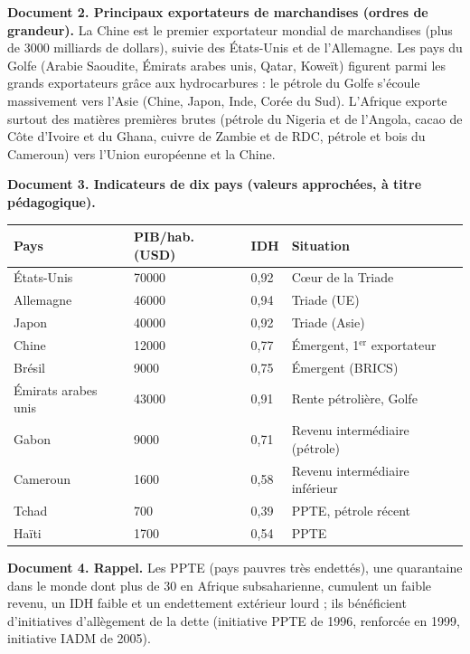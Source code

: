 \documentclass[11pt]{article}
\begin{document}
\textbf{Document 2. Principaux exportateurs de marchandises (ordres de grandeur).} La Chine est le premier exportateur mondial de marchandises (plus de \num{3000} milliards de dollars), suivie des États-Unis et de l'Allemagne. Les pays du Golfe (Arabie Saoudite, Émirats arabes unis, Qatar, Koweït) figurent parmi les grands exportateurs grâce aux hydrocarbures : le pétrole du Golfe s'écoule massivement vers l'Asie (Chine, Japon, Inde, Corée du Sud). L'Afrique exporte surtout des matières premières brutes (pétrole du Nigeria et de l'Angola, cacao de Côte d'Ivoire et du Ghana, cuivre de Zambie et de RDC, pétrole et bois du Cameroun) vers l'Union européenne et la Chine.

\textbf{Document 3. Indicateurs de dix pays (valeurs approchées, à titre pédagogique).}

\begin{center}
\begin{tabularx}{\linewidth}{|l|X|X|X|}
\hline
\rowcolor{popblueL} \textbf{Pays} & \textbf{PIB/hab. (USD)} & \textbf{IDH} & \textbf{Situation} \\
\hline
États-Unis & \num{70000} & 0,92 & Cœur de la Triade \\
\hline
Allemagne & \num{46000} & 0,94 & Triade (UE) \\
\hline
Japon & \num{40000} & 0,92 & Triade (Asie) \\
\hline
Chine & \num{12000} & 0,77 & Émergent, 1$^{\text{er}}$ exportateur \\
\hline
Brésil & \num{9000} & 0,75 & Émergent (BRICS) \\
\hline
Émirats arabes unis & \num{43000} & 0,91 & Rente pétrolière, Golfe \\
\hline
Gabon & \num{9000} & 0,71 & Revenu intermédiaire (pétrole) \\
\hline
Cameroun & \num{1600} & 0,58 & Revenu intermédiaire inférieur \\
\hline
Tchad & \num{700} & 0,39 & PPTE, pétrole récent \\
\hline
Haïti & \num{1700} & 0,54 & PPTE \\
\hline
\end{tabularx}
\end{center}

\textbf{Document 4. Rappel.} Les PPTE (pays pauvres très endettés), une quarantaine dans le monde dont plus de 30 en Afrique subsaharienne, cumulent un faible revenu, un IDH faible et un endettement extérieur lourd ; ils bénéficient d'initiatives d'allègement de la dette (initiative PPTE de 1996, renforcée en 1999, initiative IADM de 2005).
\end{document}
